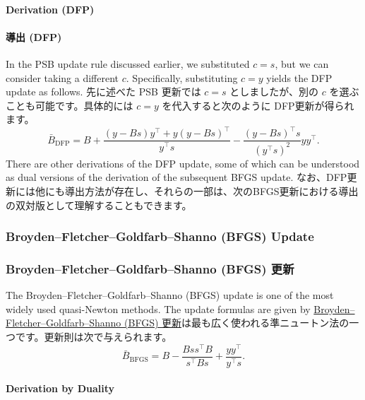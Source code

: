 \documentclass[0_main]{subfiles}
\begin{document}
\ifEn
    \paragraph{Derivation (DFP)}
\else
    \paragraph{導出 (DFP)}
\fi

\ifEn
    In the PSB update rule discussed earlier, we substituted $c=s$, but we can consider taking a different $c$. Specifically, substituting $c=y$ yields the DFP update as follows.
\else
    先に述べた PSB 更新では $c=s$ としましたが、別の $c$ を選ぶことも可能です。具体的には $c=y$ を代入すると次のように DFP更新が得られます。
\fi
\begin{equation*}
    \bar{B}_{\mathrm{DFP}} = B + \frac{(y - Bs)y^\top + y(y - Bs)^\top}{y^\top s} - \frac{(y - Bs)^\top s}{(y^\top s)^2} yy^\top.
\end{equation*}
\ifEn
    There are other derivations of the DFP update, some of which can be understood as dual versions of the derivation of the subsequent BFGS update.
\else
    なお、DFP更新には他にも導出方法が存在し、それらの一部は、次のBFGS更新における導出の双対版として理解することもできます。
\fi

\ifEn
    \subsubsection{Broyden--Fletcher--Goldfarb--Shanno (BFGS) Update}
\else
    \subsubsection{Broyden--Fletcher--Goldfarb--Shanno (BFGS) 更新}
\fi

\ifEn
    The Broyden--Fletcher--Goldfarb--Shanno (BFGS) update is one of the most widely used quasi-Newton methods. The update formulas are given by
\else
    \href{https://en.wikipedia.org/wiki/Broyden%E2%80%93Fletcher%E2%80%93Goldfarb%E2%80%93Shanno_algorithm}{Broyden--Fletcher--Goldfarb--Shanno (BFGS) 更新}は最も広く使われる準ニュートン法の一つです。更新則は次で与えられます。
\fi
\begin{equation*}
    \bar{B}_{\mathrm{BFGS}} = B - \frac{B s s^\top B}{s^\top B s} + \frac{y y^\top}{y^\top s}.
\end{equation*}

\ifEn
    \paragraph{Derivation by Duality}
\else
\end{document}
